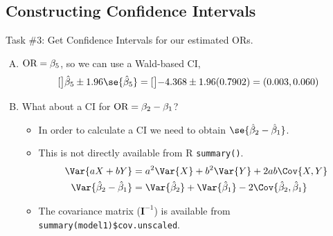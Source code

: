 \documentclass[oneside]{book}\usepackage[]{graphicx}\usepackage[svgnames]{xcolor}
\let\exp\relax%
\providecommand{\Matrix}[1]{\bm{#1}}
\begin{document}
\subsection*{Constructing Confidence Intervals}
\begin{Example}{}
      Task \#3: Get Confidence Intervals for our estimated ORs.
\end{Example}
\begin{enumerate}[A.]
      \item $ \text{OR}=\exp{\beta_5} $, so we can use a Wald-based CI,
            \[ \exp[\big]{\hat{\beta}_5\pm 1.96\se{\hat{\beta}_5}}=\exp[\big]{-4.368\pm 1.96(0.7902)}=(0.003,0.060) \]
      \item What about a CI for $ \text{OR}=\exp{\beta_2-\beta_1} $?
            \begin{itemize}
                  \item In order to calculate a CI we need to obtain $ \se{\hat{\beta}_2-\hat{\beta}_1} $.
                  \item This is not directly available from R \texttt{summary()}.
                        \begin{align*}
                              \Var{aX+bY}                       & =a^2\Var{X}+b^2\Var{Y}+2ab\Cov{X,Y}                                         \\
                              \Var{\hat{\beta}_2-\hat{\beta}_1} & =\Var{\hat{\beta}_2}+\Var{\hat{\beta}_1}-2\Cov{\hat{\beta}_2,\hat{\beta}_1}
                        \end{align*}
                  \item The covariance matrix ($ \Matrix{I}^{-1} $) is available from \texttt{summary(model1)\$cov.unscaled}.
            \end{itemize}
\end{enumerate}
\end{document}
